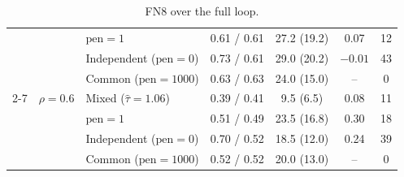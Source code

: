 \documentclass[a4paper, 11pt]{article}
\newcommand{\pen}{\mathrm{pen}}
\theoremstyle{plain}
\theoremstyle{remark}
\begin{document}
\begin{table}[h]
\begin{tabular}{lllcccc}
 & & $\pen = 1$ & 0.61 / 0.61 & 27.2 (19.2) & 0.07 & 12 \\
 & & Independent ($\pen = 0$) & 0.73 / 0.61 & 29.0 (20.2) & $-0.01$ & 43 \\
 & & Common ($\pen = 1000$) & 0.63 / 0.63 & 24.0 (15.0) & -- & 0 \\
\cmidrule{2-7}
 & $\rho = 0.6$ & Mixed ($\hat\tau = 1.06$) & 0.39 / 0.41 & 9.5 (6.5) & 0.08 & 11 \\
 & & $\pen = 1$ & 0.51 / 0.49 & 23.5 (16.8) & 0.30 & 18 \\
 & & Independent ($\pen = 0$) & 0.70 / 0.52 & 18.5 (12.0) & 0.24 & 39 \\
 & & Common ($\pen = 1000$) & 0.52 / 0.52 & 20.0 (13.0) & -- & 0 \\
\bottomrule
\end{tabular}
\caption{FN8 over the full loop.}\label{tab:pipeline}
\end{table}
\end{document}
